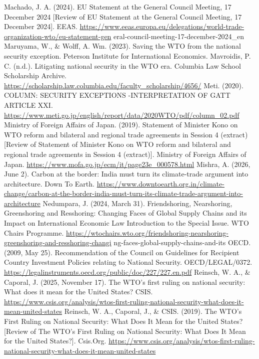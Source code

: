 \begin{referencelist}
   Machado, J. A. (2024). EU Statement at the General Council Meeting, 17 December 2024 [Review of EU Statement at the General Council Meeting, 17 December 2024]. EEAS. \url{https://www.eeas.europa.eu/delegations/world-trade-organization-wto/eu-statement-gen} eral-council-meeting-17-december-2024\_en Maruyama, W., \& Wolff, A.
   Wm. (2023). Saving the WTO from the national security exception. Peterson Institute for International Economics.
   Mavroidis, P. C. (n.d.). Litigating national security in the WTO era. Columbia Law School Scholarship Archive. \url{https://scholarship.law.columbia.edu/faculty_scholarship/4656/}
   Meti. (2020). COLUMN: SECURITY EXCEPTIONS -INTERPRETATION OF GATT ARTICLE XXI. \url{https://www.meti.go.jp/english/report/data/2020WTO/pdf/column_02.pdf}
   Ministry of Foreign Affairs of Japan. (2019). Statement of Minister Kono on WTO reform and bilateral and regional trade agreements in Session 4 (extract) [Review of Statement of Minister Kono on WTO reform and bilateral and regional trade agreements in Session 4 (extract)]. Ministry of Foreign Affairs of Japan. \url{https://www.mofa.go.jp/ecm/it/page23e_000578.html}
   Mishra, A. (2026, June 2). Carbon at the border: India must turn its climate-trade argument into architecture. Down To Earth. \url{https://www.downtoearth.org.in/climate-change/carbon-at-the-border-india-must-turn-its-climate-trade-argument-into-architecture}
   Nedumpara, J. (2024, March 31). Friendshoring, Nearshoring, Greenshoring and Resshoring: Changing Faces of Global Supply Chains and its Impact on International Economic Law Introduction to the Special Issue. WTO Chairs Programme. \url{https://wtochairs.wto.org/friendshoring-nearshoring-greenshoring-and-resshoring-changi} ng-faces-global-supply-chains-and-its
   OECD. (2009, May 25). Recommendation of the Council on Guidelines for Recipient Country Investment Policies relating to National Security. OECD/LEGAL/0372. \url{https://legalinstruments.oecd.org/public/doc/227/227.en.pdf} Reinsch, W.
   A., \& Caporal, J. (2025, November 17). The WTO's first ruling on national security: What does it mean for the United States? CSIS. \url{https://www.csis.org/analysis/wtos-first-ruling-national-security-what-does-it-mean-united-states} Reinsch, W.
   A., Caporal, J., \& CSIS. (2019). The WTO’s First Ruling on National Security: What Does It Mean for the United States? [Review of The WTO’s First Ruling on National Security: What Does It Mean for the United States?]. Csis.Org. \url{https://www.csis.org/analysis/wtos-first-ruling-national-security-what-does-it-mean-united-states}

\end{referencelist}
